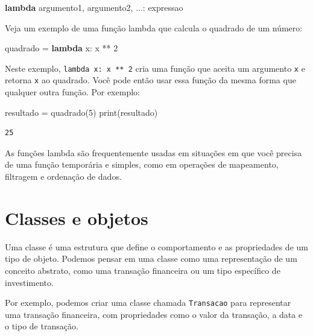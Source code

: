 \documentclass[
  portuguese,
  letterpaper,
  DIV=11,
  numbers=noendperiod]{scrreprt}
\newenvironment{Shaded}{\begin{snugshade}}{\end{snugshade}}
\newcommand{\BuiltInTok}[1]{\textcolor[rgb]{0.00,0.23,0.31}{#1}}
\newcommand{\DecValTok}[1]{\textcolor[rgb]{0.68,0.00,0.00}{#1}}
\newcommand{\KeywordTok}[1]{\textcolor[rgb]{0.00,0.23,0.31}{\textbf{#1}}}
\newcommand{\NormalTok}[1]{\textcolor[rgb]{0.00,0.23,0.31}{#1}}
\newcommand{\OperatorTok}[1]{\textcolor[rgb]{0.37,0.37,0.37}{#1}}
\theoremstyle{definition}
\theoremstyle{remark}
\begin{document}
\begin{Shaded}
\begin{Highlighting}[]
\KeywordTok{lambda}\NormalTok{ argumento1, argumento2, ...: expressao}
\end{Highlighting}
\end{Shaded}

Veja um exemplo de uma função lambda que calcula o quadrado de um
número:

\begin{Shaded}
\begin{Highlighting}[]
\NormalTok{quadrado }\OperatorTok{=} \KeywordTok{lambda}\NormalTok{ x: x }\OperatorTok{**} \DecValTok{2}
\end{Highlighting}
\end{Shaded}

Neste exemplo, \texttt{lambda\ x:\ x\ **\ 2} cria uma função que aceita
um argumento \texttt{x} e retorna \texttt{x} ao quadrado. Você pode
então usar essa função da mesma forma que qualquer outra função. Por
exemplo:

\begin{Shaded}
\begin{Highlighting}[]
\NormalTok{resultado }\OperatorTok{=}\NormalTok{ quadrado(}\DecValTok{5}\NormalTok{)}
\BuiltInTok{print}\NormalTok{(resultado)}
\end{Highlighting}
\end{Shaded}

\begin{verbatim}
25
\end{verbatim}

As funções lambda são frequentemente usadas em situações em que você
precisa de uma função temporária e simples, como em operações de
mapeamento, filtragem e ordenação de dados.

\section{Classes e objetos}\label{classes-e-objetos}

Uma classe é uma estrutura que define o comportamento e as propriedades
de um tipo de objeto. Podemos pensar em uma classe como uma
representação de um conceito abstrato, como uma transação financeira ou
um tipo específico de investimento.

Por exemplo, podemos criar uma classe chamada \texttt{Transacao} para
representar uma transação financeira, com propriedades como o valor da
transação, a data e o tipo de transação.
\end{document}
